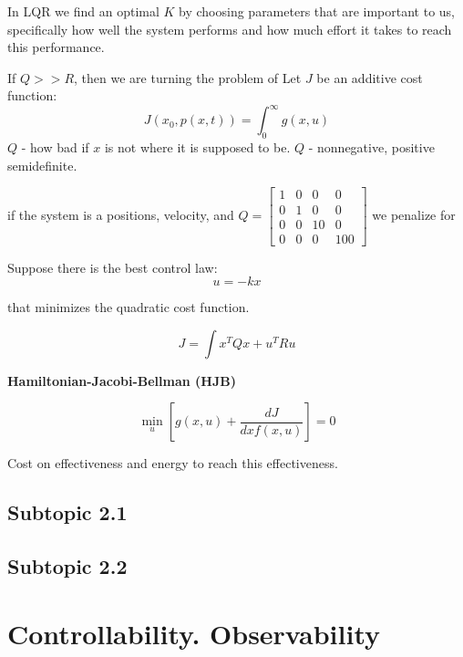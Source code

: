 In LQR we find an optimal \(K\) by choosing parameters that are important to us, specifically how well the system performs and how much effort it takes to reach this performance.

If \(Q>>R\), then we are turning the problem of 
Let \(J\) be an additive cost function:
\[J(x_0, p(x, t)) = \int_{0}^{\infty} g(x, u)\]
\(Q\) - how bad if \(x\) is not where it is supposed to be.
\(Q\) - nonnegative, positive semidefinite.

if the system is a positions, velocity, and \(Q = \begin{bmatrix} 1 & 0 & 0 & 0 \\ 0 & 1 & 0 & 0 \\ 0 & 0 & 10 & 0 \\ 0 & 0 & 0 & 100 \end{bmatrix}\) we penalize for 

Suppose there is the best control law:
\[u = -kx\]

that minimizes the quadratic cost function.

\[J = \int x^T Q x + u^T R u\]

\textbf{Hamiltonian-Jacobi-Bellman (HJB)}

\[\min_u [g(x, u) + \frac{dJ}{dx f(x, u)}] = 0\]

Cost on effectiveness and energy to reach this effectiveness.

\subsection{Subtopic 2.1}

\subsection{Subtopic 2.2}



\section{Controllability. Observability}

